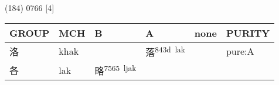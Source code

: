 \documentclass[14pt,a4paper]{scrartcl}
\begin{document}
(184) 0766 {[}4{]}

\begin{longtable}[c]{@{}llllll@{}}
\toprule
\begin{minipage}[b]{0.14\columnwidth}\raggedright\strut
GROUP
\strut\end{minipage} &
\begin{minipage}[b]{0.14\columnwidth}\raggedright\strut
MCH
\strut\end{minipage} &
\begin{minipage}[b]{0.14\columnwidth}\raggedright\strut
B
\strut\end{minipage} &
\begin{minipage}[b]{0.14\columnwidth}\raggedright\strut
A
\strut\end{minipage} &
\begin{minipage}[b]{0.14\columnwidth}\raggedright\strut
none
\strut\end{minipage} &
\begin{minipage}[b]{0.14\columnwidth}\raggedright\strut
PURITY
\strut\end{minipage}\tabularnewline
\midrule
\endhead
\begin{minipage}[t]{0.14\columnwidth}\raggedright\strut
洛
\strut\end{minipage} &
\begin{minipage}[t]{0.14\columnwidth}\raggedright\strut
khak
\strut\end{minipage} &
\begin{minipage}[t]{0.14\columnwidth}\raggedright\strut
\strut\end{minipage} &
\begin{minipage}[t]{0.14\columnwidth}\raggedright\strut
落\textsuperscript{843d~lak}
\strut\end{minipage} &
\begin{minipage}[t]{0.14\columnwidth}\raggedright\strut
\strut\end{minipage} &
\begin{minipage}[t]{0.14\columnwidth}\raggedright\strut
pure:A
\strut\end{minipage}\tabularnewline
\begin{minipage}[t]{0.14\columnwidth}\raggedright\strut
各
\strut\end{minipage} &
\begin{minipage}[t]{0.14\columnwidth}\raggedright\strut
lak
\strut\end{minipage} &
\begin{minipage}[t]{0.14\columnwidth}\raggedright\strut
略\textsuperscript{7565~ljak}

\end{minipage}
\end{longtable}
\end{document}
